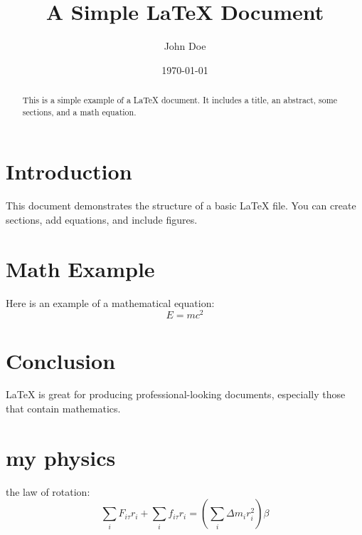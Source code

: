\documentclass[12pt]{article}
\title{A Simple \LaTeX{} Document}
\author{John Doe}
\date{\today}
\begin{document}
\maketitle

\begin{abstract}
    This is a simple example of a \LaTeX{} document.
It includes a title, an abstract, some sections, and a math equation.
\end{abstract}

\section{Introduction}
    This document demonstrates the structure of a basic LaTeX file. You can create sections, add equations, and include figures.

\section{Math Example}
    Here is an example of a mathematical equation:
\[
E = mc^2
\]

\section{Conclusion}
LaTeX is great for producing professional-looking documents, especially those that contain mathematics.

\section{my physics}
    the law of rotation:
\begin{equation}
    \sum_i F_{i\tau}  r_i + \sum_i f_{i\tau}   r_i = \left( \sum_i \Delta m_i r_i^2 \right) \beta
\end{equation}
\end{document}
